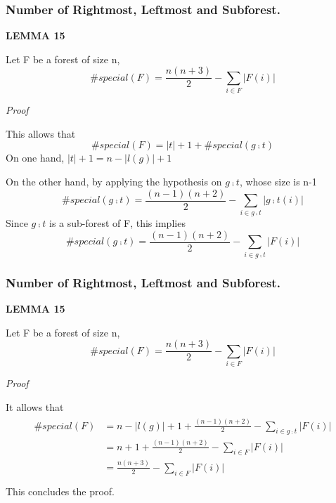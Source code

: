 \documentclass{beamer}
\begin{document}

\begin{frame}
\frametitle{Number of Rightmost, Leftmost and Subforest.}
\textbf{LEMMA 15}

Let F be a forest of size n,
\begin{displaymath}
\#special(F) = \frac{n(n+3)}{2} - \sum_{i \in F} \left\vert F(i) \right\vert
\end{displaymath}

\emph{Proof}

This allows that 
\begin{displaymath}
\#special(F) = \left\vert t \right\vert + 1 + \#special(g \comp t)
\end{displaymath}
On one hand, $\left\vert t \right\vert + 1 = n - \left\vert l(g) \right\vert + 1$

On the other hand, by applying the hypothesis on $g \comp t$, whose size is n-1
\begin{displaymath}
\#special(g \comp t) = \frac{(n-1)(n+2)}{2} - \sum_{i \in g \comp t} \left\vert g \comp t(i) \right\vert
\end{displaymath}
Since $g\comp t$ is a sub-forest of F, this implies
\begin{displaymath}
\#special(g \comp t) = \frac{(n-1)(n+2)}{2} - \sum_{i \in g \comp t} \left\vert F(i) \right\vert
\end{displaymath}
\end{frame}


\begin{frame}
\frametitle{Number of Rightmost, Leftmost and Subforest.}
\textbf{LEMMA 15}

Let F be a forest of size n,
\begin{displaymath}
\#special(F) = \frac{n(n+3)}{2} - \sum_{i \in F} \left\vert F(i) \right\vert
\end{displaymath}

\emph{Proof}

It allows that 
\begin{eqnarray*}
\begin{split}
\#special(F) & = n - \left\vert l(g) \right\vert + 1 + \frac{(n-1)(n+2)}{2} - \sum_{i \in g \comp t}\left\vert F(i) \right\vert \\
& = n + 1 + \frac{(n-1)(n+2)}{2} - \sum_{i \in F} \left\vert F(i) \right\vert \\
& = \frac{n(n+3)}{2} - \sum_{i \in F}\left\vert F(i) \right\vert \\ 
\end{split}
\end{eqnarray*}
This concludes the proof.
\end{frame}
\end{document}
